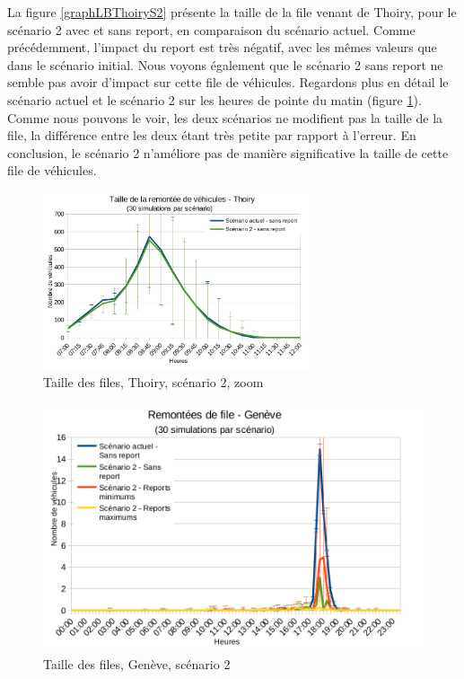 \documentclass[a4paper,11pt, titlepage]{extarticle}
\begin{document}
La figure \ref{graphLBThoiryS2} présente la taille de la file venant de Thoiry, pour le scénario 2 avec et sans report, en comparaison du scénario actuel. Comme précédemment, l'impact du report est très négatif, avec les mêmes valeurs que dans le scénario initial. Nous voyons également que le scénario 2 sans report ne semble pas avoir d'impact sur cette file de véhicules. Regardons plus en détail le scénario actuel et le scénario 2 sur les heures de pointe du matin (figure \ref{graphLBThoiryS2Zoom}). Comme nous pouvons le voir, les deux scénarios ne modifient pas la taille de la file, la différence entre les deux étant très petite par rapport à l'erreur. En conclusion, le scénario 2 n'améliore pas de manière significative la taille de cette file de véhicules.

\begin{figure}[!h]
  \begin{center}
    \includegraphics[width=8cm]{graphiques/leakyB_thoiry_s1s2.png}
  \end{center}
  \vspace{-0.8cm}
  \caption{Taille des files, Thoiry, scénario 2, zoom}
  \label{graphLBThoiryS2Zoom}
\end{figure}

\begin{figure}[!h]
  \begin{center}
    \includegraphics[width=13cm]{graphiques/leakyB_geneve_s2.png}
  \end{center}
  \vspace{-0.8cm}
  \caption{Taille des files, Genève, scénario 2}
  \label{graphLBGeneveS2}
\end{figure}
\end{document}
